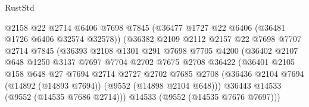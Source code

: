 \begin{lexlean}{RustStd}
\begin{coremodule}
                                  @2158
                                  @22
                                  @2714
                                  @6406
                                  @7698
                                  @7845
                                  (@36477 @1727 @22 @6406 (@36481 @1726 @6406 @32574 @32578))
                                  (@36382
                                    @2109
                                    @2112
                                    @2157
                                    @22
                                    @7698
                                    @7707
                                    @2714
                                    @7845
                                    (@36393
                                      @2108
                                      @1301
                                      @291
                                      @7698
                                      @7705
                                      @4200
                                      (@36402
                                        @2107
                                        @648
                                        @1250
                                        @3137
                                        @7697
                                        @7704
                                        @2702
                                        @7675
                                        @2708
                                        @36422
                                        (@36401
                                          @2105
                                          @158
                                          @648
                                          @27
                                          @7694
                                          @2714
                                          @2727
                                          @2702
                                          @7685
                                          @2708
                                          (@36436
                                            @2104
                                            @7694
                                            (@14892 (@14893 @7694))
                                            (@9552 (@14898 @2104 @648)))
                                          @36443
                                          @14533
                                          (@9552 (@14535 @7686 @2714)))
                                        @14533
                                        (@9552 (@14535 @7676 @7697)))

\end{coremodule}
\end{lexlean}

